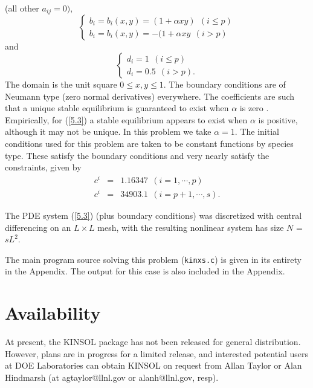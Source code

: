 (all other $a_{ij} = 0 ) ,$
\begin{equation}
\left\{
\begin{array}{l}
b_i = b_i(x,y) = (1 + \alpha xy )  ~ ~ ( i \leq p ) \\
b_i = b_i(x,y) = -(1 + \alpha xy   ~ ~ ( i > p )
\end{array}  \right.
\end{equation}
and
\begin{equation}
\left\{
\begin{array}{l}
d_i =   1 ~ ~ ( i \leq p ) \\
d_i = 0.5 ~ ~ ( i > p ) .
\end{array}  \right.
\end{equation}
The domain is the unit square $0 \leq x,y \leq 1$.  The boundary conditions are
of Neumann type (zero normal derivatives) everywhere.  The coefficients are
such that a unique stable equilibrium is guaranteed to exist when $\alpha$
is zero \cite{Br86}.  Empirically, for (\ref{5.3}) a stable 
equilibrium appears to exist when $\alpha$ is positive, although 
it may not be unique. In this problem we take $\alpha = 1$.
The initial conditions used for this problem are taken to be constant functions
by species type. These satisfy the boundary conditions and very nearly
satisfy the constraints, given by
\begin{eqnarray*}
c^i & = & 1.16347 ~~ (i=1, \cdots, p)\\
c^i & = & 34903.1 ~~ (i=p+1, \cdots, s).
\end{eqnarray*}

The PDE system (\ref{5.3}) (plus boundary conditions) was discretized
with central differencing on an $L \times L$ mesh, with the resulting nonlinear
system has size $N$ = $s L^2$.

The main program source solving this problem ({\tt kinxs.c}) is given in its 
entirety in the Appendix. The output for this case is also included in the
Appendix.

\section{Availability}

At present, the KINSOL package has not been released for general
distribution. However, plans are in progress for a limited release, and
interested potential users at DOE Laboratories can obtain KINSOL on request
from Allan Taylor or Alan Hindmarsh (at agtaylor@llnl.gov or alanh@llnl.gov, 
resp). 

